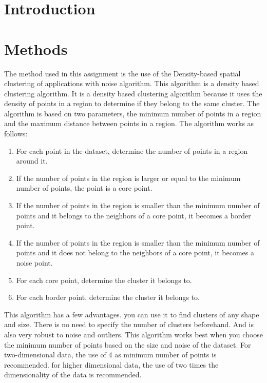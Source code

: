 \documentclass[twoside, a4paper, fleqn, reqno]{article}
\begin{document}
\maketitle

\section{Introduction}

\section{Methods}

The method used in this assignment is the use of the Density-based spatial clustering of applications with noise algorithm. 
This algorithm is a density based clustering algorithm. 
It is a density based clustering algorithm because it uses the density of points in a region to determine if they belong to the same cluster. 
The algorithm is based on two parameters, the minimum number of points in a region and the maximum distance between points in a region. 
The algorithm works as follows:
\begin{enumerate}
	\item For each point in the dataset, determine the number of points in a region around it.
	\item If the number of points in the region is larger or equal to the minimum number of points, the point is a core point.
	\item If the number of points in the region is smaller than the minimum number of points and it belongs to the neighbors of a core point, it becomes a border point.
	\item If the number of points in the region is smaller than the minimum number of points and it does not belong to the neighbors of a core point, it becomes a noise point.
	\item For each core point, determine the cluster it belongs to.
	\item For each border point, determine the cluster it belongs to.
\end{enumerate}
This algorithm has a few advantages. you can use it to find clusters of any shape and size.
There is no need to specify the number of clusters beforehand. And is also very robust to noise and outliers.
This algorithm works best when you choose the minimum number of points based on the size and noise of the dataset.
For two-dimensional data, the use of 4 as minimum number of points is recommended.
for higher dimensional data, the use of two times the dimensionality of the data is recommended.
\end{document}
